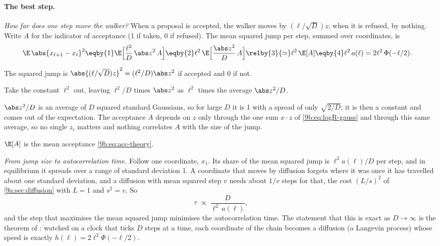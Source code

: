 \paragraph{The best step.}
\emph{How far does one step move the walker?} When a proposal is accepted, the walker moves by
$(\ell/\sqrt D)z$; when it is refused, by nothing. Write $A$ for the indicator of acceptance (1 if
taken, 0 if refused). The mean squared jump per step, summed over coordinates, is
\begin{align}
  \E\,\abs{x_{t+1}-x_t}^2
  &\eqby{1}\E\Bigl[\frac{\ell^2}{D}\,\abs z^2\,A\Bigr]
   \eqby{2}\ell^2\,\E\Bigl[\frac{\abs z^2}{D}\,A\Bigr]
   \relby{3}{\simeq}\ell^2\,\E[A]
   \eqby{4}\ell^2\,a(\ell)=2\ell^2\,\Phi(-\ell/2).
  \label{9b:eq:esjd}
\end{align}
\begin{explain}
  \item The squared jump is $\abs{(\ell/\sqrt D)z}^2=(\ell^2/D)\abs z^2$ if accepted and 0 if not.
  \item Take the constant $\ell^2$ out, leaving $\ell^2/D$ times $\abs z^2$ as $\ell^2$ times the
        average $\abs z^2/D$.
  \item $\abs z^2/D$ is an average of $D$ squared standard Gaussians, so for large $D$ it is 1
        with a spread of only $\sqrt{2/D}$; it is then a constant and comes out of the expectation.
        The acceptance $A$ depends on $z$ only through the one sum $x\cdot z$ of
        \eqref{9b:eq:logR-gauss} and through this same average, so no single $z_i$ matters and
        nothing correlates $A$ with the size of the jump.
  \item $\E[A]$ is the mean acceptance \eqref{9b:eq:acc-theory}.
\end{explain}

\emph{From jump size to autocorrelation time.} Follow one coordinate, $x_1$. Its share of the
mean squared jump is $\ell^2a(\ell)/D$ per step, and in equilibrium it spreads over a range of
standard deviation 1. A coordinate that moves by diffusion forgets where it was once it has
travelled about one standard deviation, and a diffusion with mean squared step $v$ needs about
$1/v$ steps for that, the cost $(L/s)^2$ of \cref{9a:sec:diffusion} with $L=1$ and $s^2=v$. So
\begin{equation*}
  \tau\;\propto\;\frac{D}{\ell^2\,a(\ell)} ,
\end{equation*}
and the step that maximises the mean squared jump minimises the autocorrelation time. The
statement that this is exact as $D\to\infty$ is the theorem of
\textcite{RobertsGelmanGilks1997}: watched on a clock that ticks $D$ steps at a time, each
coordinate of the chain becomes a diffusion (a Langevin process) whose speed is exactly
$h(\ell)=2\ell^2\Phi(-\ell/2)$.

